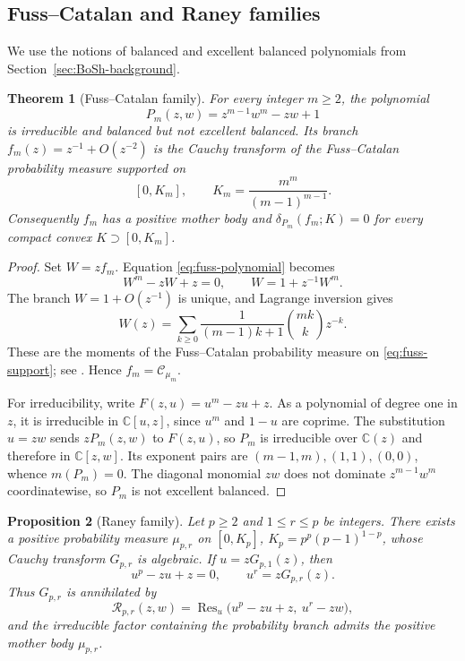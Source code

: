 \documentclass[reqno]{amsart}
\newtheorem{theorem}{Theorem}[section]
\newtheorem{proposition}[theorem]{Proposition}
\theoremstyle{definition}
\theoremstyle{remark}
\newcommand{\bC}{\mathbb C}
\newcommand{\Cauchy}{\mathcal C}
\begin{document}
\subsection{Fuss--Catalan and Raney families}

We use the notions of balanced and excellent balanced polynomials from
Section~\ref{sec:BoSh-background}.

\begin{theorem}[Fuss--Catalan family]\label{thm:fuss-catalan}
For every integer $m\ge2$, the polynomial
\begin{equation}\label{eq:fuss-polynomial}
 P_m(z,w)=z^{m-1}w^m-zw+1
\end{equation}
is irreducible and balanced but not excellent balanced.  Its branch
$f_m(z)=z^{-1}+O(z^{-2})$ is the Cauchy transform of the Fuss--Catalan
probability measure supported on
\begin{equation}\label{eq:fuss-support}
 [0,K_m],\qquad K_m=\frac{m^m}{(m-1)^{m-1}}.
\end{equation}
Consequently $f_m$ has a positive mother body and
$\delta_{P_m}(f_m;K)=0$ for every compact convex $K\supset[0,K_m]$.
\end{theorem}

\begin{proof}
Set $W=zf_m$.  Equation \eqref{eq:fuss-polynomial} becomes
\[
 W^m-zW+z=0,
 \qquad W=1+z^{-1}W^m.
\]
The branch $W=1+O(z^{-1})$ is unique, and Lagrange inversion gives
\[
 W(z)=\sum_{k\ge0}\frac{1}{(m-1)k+1}\binom{mk}{k}z^{-k}.
\]
These are the moments of the Fuss--Catalan probability measure on
\eqref{eq:fuss-support}; see \cite[(2.1), (2.7), and (2.10)]{ForresterLiu}.
Hence $f_m=\Cauchy_{\mu_m}$.

For irreducibility, write $F(z,u)=u^m-zu+z$.  As a polynomial of degree one in
$z$, it is irreducible in $\bC[u,z]$, since $u^m$ and $1-u$ are coprime.  The
substitution $u=zw$ sends $zP_m(z,w)$ to $F(z,u)$, so $P_m$ is irreducible over
$\bC(z)$ and therefore in $\bC[z,w]$.  Its exponent pairs are
$(m-1,m),(1,1),(0,0)$, whence $m(P_m)=0$.  The diagonal monomial $zw$ does not
dominate $z^{m-1}w^m$ coordinatewise, so $P_m$ is not excellent balanced.
\end{proof}

\begin{proposition}[Raney family]\label{prop:raney}
Let $p\ge2$ and $1\le r\le p$ be integers.  There exists a positive probability
measure $\mu_{p,r}$ on
$[0,K_p]$, $K_p=p^p(p-1)^{1-p}$, whose Cauchy transform $G_{p,r}$ is algebraic.
If $u=zG_{p,1}(z)$, then
\begin{equation}\label{eq:raney-relations}
 u^p-zu+z=0,\qquad u^r=zG_{p,r}(z).
\end{equation}
Thus $G_{p,r}$ is annihilated by
\begin{equation}\label{eq:raney-resultant}
 \mathcal R_{p,r}(z,w)=
 \operatorname{Res}_u\bigl(u^p-zu+z,\ u^r-zw\bigr),
\end{equation}
and the irreducible factor containing the probability branch admits the positive
mother body $\mu_{p,r}$.
\end{proposition}
\end{document}
